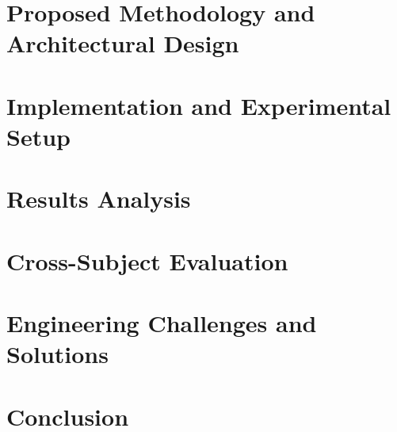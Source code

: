 \documentclass[Times,12pt,oneside,openany,print,index]{report}
\begin{document}
\chapter{Proposed Methodology and Architectural Design}


\chapter{Implementation and Experimental Setup}


\chapter{Results Analysis}


\chapter{Cross-Subject Evaluation}
\label{chap:crosssubject}


\chapter{Engineering Challenges and Solutions}
\label{chap:engineering_challenges}


\chapter{Conclusion}




\nocite{*}
\printbibliography %
\end{document}
